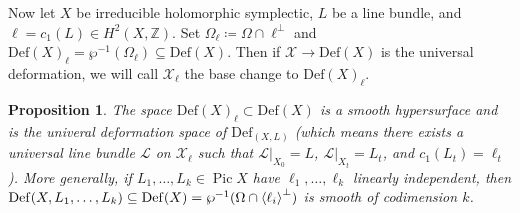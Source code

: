 \documentclass[leqno, openany]{memoir}
\newtheorem{prop}[thm]{Proposition}
\theoremstyle{definition}
\theoremstyle{remark}
\theoremstyle{plain}
\theoremstyle{definition}
\theoremstyle{remark}
\newcommand{\Z}{\mathbb{Z}}
\newcommand{\mc}[1]{\mathcal{#1}}
\newcommand{\mr}[1]{\mathrm{#1}}
\DeclareMathOperator{\Pic}{Pic}
\begin{document}
Now let $X$ be irreducible holomorphic symplectic, $L$ be a line bundle, and $\ell = c_1(L) \in H^2(X, \Z)$. Set $\Omega_{\ell} \coloneqq \Omega \cap \ell^{\perp}$ and ${\mr{Def}(X)}_{\ell} = \wp^{-1} (\Omega_{\ell}) \subseteq \mr{Def}(X)$. Then if $\mc{X} \to \mr{Def}(X)$ is the universal deformation, we will call $\mc{X}_{\ell}$ the base change to ${\mr{Def}(X)}_{\ell}$.

\begin{prop}
    The space $\mr{Def}(X)_{\ell} \subset \mr{Def}(X)$ is a smooth hypersurface and is the univeral deformation space of $\mr{Def}_{(X, L)}$ (which means there exists a universal line bundle $\mc{L}$ on $\mc{X}_{\ell}$ such that $\mc{L} |_{X_0} = L$, $\mc{L} |_{X_t} = L_t$, and $c_1(L_t) = \ell_t$). More generally, if $L_1, \ldots, L_k \in \Pic X$ have $\ell_1, \ldots, \ell_k$ linearly independent, then $\mr{Def}(X, L_1, \ldots, L_k) \subseteq \mr{Def}(X) = \wp^{-1}(\Omega \cap \ev{\ell_i}^{\perp})$ is smooth of codimension $k$.
\end{prop}
\end{document}
